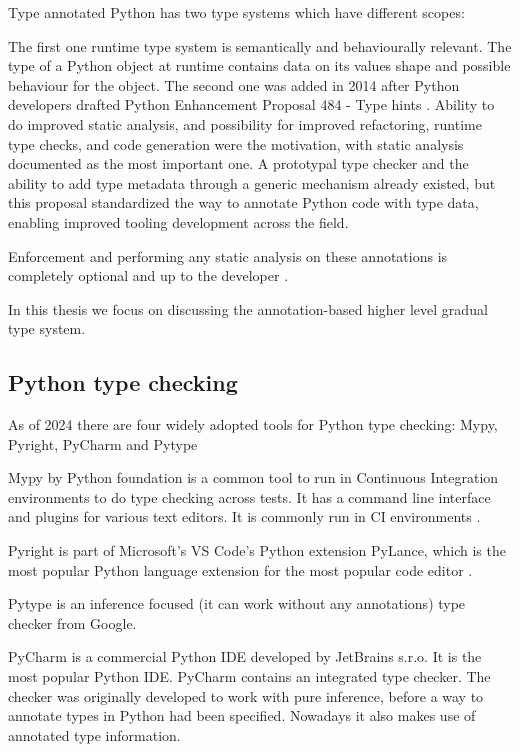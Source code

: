 Type annotated Python has two type systems which have different scopes:

The first one  runtime type system is semantically and behaviourally relevant. The type of a Python object at runtime contains data on its values shape and possible behaviour for the object. 
The second one was added in 2014 after Python developers drafted Python Enhancement Proposal 484 - Type hints \cite{pep_484}. Ability to do improved static analysis, and possibility for improved refactoring, runtime type checks, and code generation were the motivation, with static analysis documented as the most important one. A prototypal type checker and the ability to add type metadata through a generic mechanism already existed, but this proposal standardized the way to annotate Python code with type data, enabling improved tooling development across the field.

Enforcement and performing any static analysis on these annotations is completely optional and up to the developer \cite{python_typing}.

In this thesis we focus on discussing the annotation-based higher level gradual type system.

 
\subsection{Python type checking}
As of 2024 there are four widely adopted tools for Python type checking: Mypy, Pyright, PyCharm and Pytype %


Mypy by Python foundation is a common tool to run in Continuous Integration environments to do type checking across tests. It has a command line interface and plugins for various text editors. It is commonly run in CI environments \cite{TODO}.

Pyright is part of Microsoft's VS Code's Python extension PyLance, which is the most popular Python language extension for the most popular code editor \cite{TODO}.

Pytype is an inference focused (it can work without any annotations) type checker from Google. 


PyCharm is a commercial Python IDE developed by JetBrains s.r.o. It is the most popular Python IDE. PyCharm contains an integrated type checker. The checker was originally developed to work with pure inference, before a way to annotate types in Python had been specified. Nowadays it also makes use of annotated type information. 


